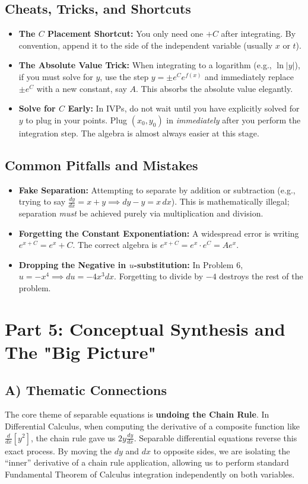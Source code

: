 \documentclass[11pt]{article}
\begin{document}
\subsection{Cheats, Tricks, and Shortcuts}
\begin{itemize}
    \item \textbf{The $C$ Placement Shortcut:} You only need one $+C$ after integrating. By convention, append it to the side of the independent variable (usually $x$ or $t$). 
    \item \textbf{The Absolute Value Trick:} When integrating to a logarithm (e.g., $\ln|y|$), if you must solve for $y$, use the step $y = \pm e^C e^{f(x)}$ and immediately replace $\pm e^C$ with a new constant, say $A$. This absorbs the absolute value elegantly.
    \item \textbf{Solve for $C$ Early:} In IVPs, do not wait until you have explicitly solved for $y$ to plug in your points. Plug $(x_0, y_0)$ in \textit{immediately} after you perform the integration step. The algebra is almost always easier at this stage.
\end{itemize}

\subsection{Common Pitfalls and Mistakes}
\begin{itemize}
    \item \textbf{Fake Separation:} Attempting to separate by addition or subtraction (e.g., trying to say $\frac{dy}{dx} = x + y \implies dy - y = x \, dx$). This is mathematically illegal; separation \textit{must} be achieved purely via multiplication and division.
    \item \textbf{Forgetting the Constant Exponentiation:} A widespread error is writing $e^{x + C} = e^x + C$. The correct algebra is $e^{x + C} = e^x \cdot e^C = A e^x$.
    \item \textbf{Dropping the Negative in $u$-substitution:} In Problem 6, $u = -x^4 \implies du = -4x^3 dx$. Forgetting to divide by $-4$ destroys the rest of the problem.
\end{itemize}

\newpage
\section{Part 5: Conceptual Synthesis and The "Big Picture"}

\subsection{A) Thematic Connections}
The core theme of separable equations is \textbf{undoing the Chain Rule}. In Differential Calculus, when computing the derivative of a composite function like $\frac{d}{dx}[y^2]$, the chain rule gave us $2y \frac{dy}{dx}$. Separable differential equations reverse this exact process. By moving the $dy$ and $dx$ to opposite sides, we are isolating the ``inner'' derivative of a chain rule application, allowing us to perform standard Fundamental Theorem of Calculus integration independently on both variables.
\end{document}
